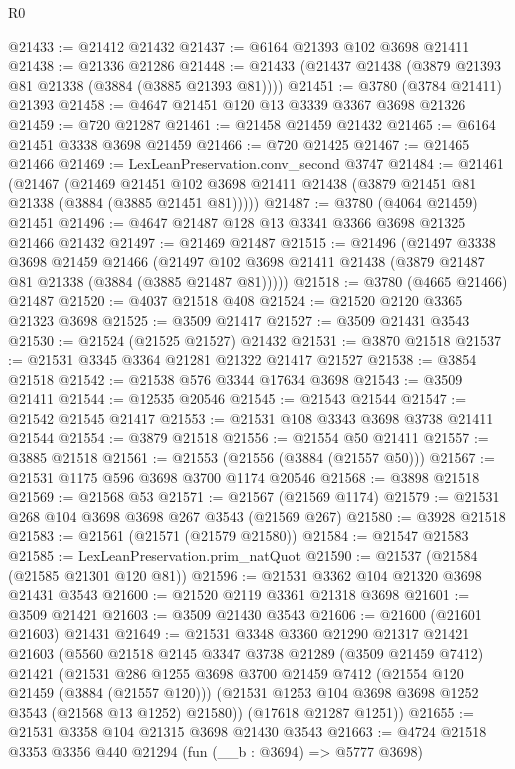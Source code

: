 \begin{lexlean}{R0}
\begin{coremodule}
@21433 := @21412 @21432
@21437 := @6164 @21393 @102 @3698 @21411
@21438 := @21336 @21286
@21448 := @21433 (@21437 @21438 (@3879 @21393 @81 @21338 (@3884 (@3885 @21393 @81))))
@21451 := @3780 (@3784 @21411) @21393
@21458 := @4647 @21451 @120 @13 @3339 @3367 @3698 @21326
@21459 := @720 @21287
@21461 := @21458 @21459 @21432
@21465 := @6164 @21451 @3338 @3698 @21459
@21466 := @720 @21425
@21467 := @21465 @21466
@21469 := LexLeanPreservation.conv_second @3747
@21484 := @21461
    (@21467
      (@21469 @21451 @102 @3698 @21411 @21438 (@3879 @21451 @81 @21338 (@3884 (@3885 @21451 @81)))))
@21487 := @3780 (@4064 @21459) @21451
@21496 := @4647 @21487 @128 @13 @3341 @3366 @3698 @21325 @21466 @21432
@21497 := @21469 @21487
@21515 := @21496
    (@21497
      @3338
      @3698
      @21459
      @21466
      (@21497 @102 @3698 @21411 @21438 (@3879 @21487 @81 @21338 (@3884 (@3885 @21487 @81)))))
@21518 := @3780 (@4665 @21466) @21487
@21520 := @4037 @21518 @408
@21524 := @21520 @2120 @3365 @21323 @3698
@21525 := @3509 @21417
@21527 := @3509 @21431 @3543
@21530 := @21524 (@21525 @21527) @21432
@21531 := @3870 @21518
@21537 := @21531 @3345 @3364 @21281 @21322 @21417 @21527
@21538 := @3854 @21518
@21542 := @21538 @576 @3344 @17634 @3698
@21543 := @3509 @21411
@21544 := @12535 @20546
@21545 := @21543 @21544
@21547 := @21542 @21545 @21417
@21553 := @21531 @108 @3343 @3698 @3738 @21411 @21544
@21554 := @3879 @21518
@21556 := @21554 @50 @21411
@21557 := @3885 @21518
@21561 := @21553 (@21556 (@3884 (@21557 @50)))
@21567 := @21531 @1175 @596 @3698 @3700 @1174 @20546
@21568 := @3898 @21518
@21569 := @21568 @53
@21571 := @21567 (@21569 @1174)
@21579 := @21531 @268 @104 @3698 @3698 @267 @3543 (@21569 @267)
@21580 := @3928 @21518
@21583 := @21561 (@21571 (@21579 @21580))
@21584 := @21547 @21583
@21585 := LexLeanPreservation.prim_natQuot
@21590 := @21537 (@21584 (@21585 @21301 @120 @81))
@21596 := @21531 @3362 @104 @21320 @3698 @21431 @3543
@21600 := @21520 @2119 @3361 @21318 @3698
@21601 := @3509 @21421
@21603 := @3509 @21430 @3543
@21606 := @21600 (@21601 @21603) @21431
@21649 := @21531
    @3348
    @3360
    @21290
    @21317
    @21421
    @21603
    (@5560
      @21518
      @2145
      @3347
      @3738
      @21289
      (@3509 @21459 @7412)
      @21421
      (@21531
        @286
        @1255
        @3698
        @3700
        @21459
        @7412
        (@21554 @120 @21459 (@3884 (@21557 @120)))
        (@21531 @1253 @104 @3698 @3698 @1252 @3543 (@21568 @13 @1252) @21580))
      (@17618 @21287 @1251))
@21655 := @21531 @3358 @104 @21315 @3698 @21430 @3543
@21663 := @4724 @21518 @3353 @3356 @440 @21294 (fun (__b : @3694) => @5777 @3698)

\end{coremodule}
\end{lexlean}
